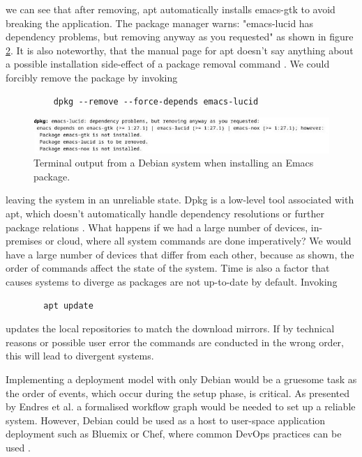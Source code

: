 we can see that after removing, apt automatically installs emacs-gtk
to avoid breaking the application. The package manager warns:
"emacs-lucid has dependency problems, but removing anyway as you
requested" as shown in figure \ref{deb_remove}. It is also noteworthy,
that the manual page for apt doesn't say anything about a possible
installation side-effect of a package removal command
\cite{ubuntuUbuntuManpage}. We could forcibly remove the package by
invoking
\begin{figure}[H]\label{dpkgsnippet}
\begin{lstlisting} 
    dpkg --remove --force-depends emacs-lucid
\end{lstlisting}
\end{figure}
\begin{figure}\label{deb_remove}
\includegraphics[scale=2.0]{latex/kuvat/cropped_apt_output.jpg}
\caption[Terminal output from Emacs installation.]{Terminal output from a Debian system when installing an Emacs package.}
\end{figure}
leaving the system in an unreliable state. Dpkg is a low-level
tool associated with apt, which doesn't automatically handle dependency
resolutions or further package relations
\cite{thiruvathukal2004gentoo}. What happens if we had a large number
of devices, in-premises or cloud, where all system commands are done
imperatively? We would have a large number of devices that differ from
each other, because as shown, the order of commands affect the state
of the system. Time is also a factor that
causes systems to diverge as packages are not up-to-date by
default. Invoking 
\begin{figure}[H]\label{aptupdate}
\begin{lstlisting} 
  apt update
\end{lstlisting}
\end{figure}
updates the local repositories to match the download mirrors. If by
technical reasons or possible user error the commands are conducted in
the wrong order, this will lead to divergent systems.

Implementing a deployment model with only Debian would be a gruesome
task as the order of events, which occur during the setup phase, is
critical. As presented by Endres et al. a formalised workflow graph
would be needed to set up a reliable system. However, Debian could
be used as a host to user-space application deployment such as
Bluemix or Chef, where common DevOps practices can be used
\cite{endres2017declarative}.

